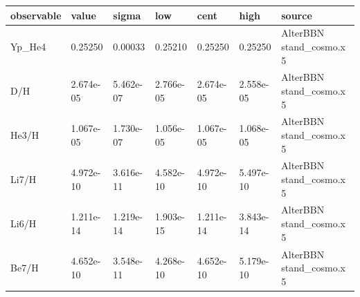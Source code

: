 \begin{tabular}{lllllll}
\toprule
observable & value & sigma & low & cent & high & source \\
\midrule
Yp_He4 & 0.25250 & 0.00033 & 0.25210 & 0.25250 & 0.25250 & AlterBBN stand_cosmo.x 5 \\
D/H & 2.674e-05 & 5.462e-07 & 2.766e-05 & 2.674e-05 & 2.558e-05 & AlterBBN stand_cosmo.x 5 \\
He3/H & 1.067e-05 & 1.730e-07 & 1.056e-05 & 1.067e-05 & 1.068e-05 & AlterBBN stand_cosmo.x 5 \\
Li7/H & 4.972e-10 & 3.616e-11 & 4.582e-10 & 4.972e-10 & 5.497e-10 & AlterBBN stand_cosmo.x 5 \\
Li6/H & 1.211e-14 & 1.219e-14 & 1.903e-15 & 1.211e-14 & 3.843e-14 & AlterBBN stand_cosmo.x 5 \\
Be7/H & 4.652e-10 & 3.548e-11 & 4.268e-10 & 4.652e-10 & 5.179e-10 & AlterBBN stand_cosmo.x 5 \\
\bottomrule
\end{tabular}
